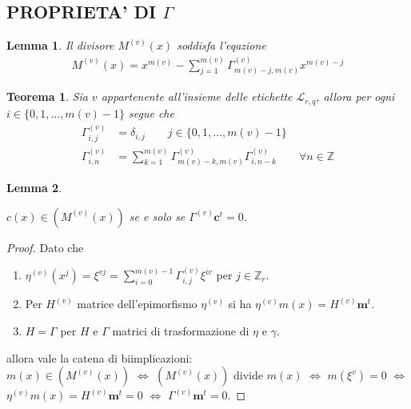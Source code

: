 \documentclass[mathserif]{beamer}
\newtheorem{lemmax}{Lemma}[section]
\newtheorem{teorema}{Teorema}
\begin{document}
\subsection{PROPRIETA' DI $\Gamma$}
\begin{frame}
    \begin{lemmax}
      Il divisore $M^{(v)}(x)$ soddisfa l'eqazione
      \begin{align*}
	  M^{(v)}(x) = x^{m(v)} - \sum_{j=1}^{m(v)} \Gamma_{m(v) - j, m(v)}^{(v)}  x^{m(v) - j}
      \end{align*}
    \end{lemmax}
    \begin{teorema} \label{teo:winogradRicorrenza}
	Sia $v$ appartenente all'insieme delle etichette $\mathscr{L}_{r,q}$, allora per ogni $i \in \lbrace  0,1, \dots, m(v) - 1 \rbrace$ segue che
	\begin{align*} \label{eq:winogradRicorrenza}
	    \Gamma_{i,j}^{(v)} &= \delta_{i,j}  \qquad j \in \lbrace  0,1, \dots, m(v) - 1 \rbrace \\
	    \Gamma_{i,n}^{(v)} &= \sum_{k=1}^{m(v)} \Gamma_{m(v) - k, m(v)}^{(v)} \Gamma_{i,n-k}^{(v)} \qquad \forall n \in \mathbb{Z}
	  \end{align*}
      \end{teorema}
\end{frame}

\begin{frame}
    \begin{lemmax}
    \begin{center}
      $c(x) \in (M^{(v)}(x))$ se e solo se  $\Gamma^{(v)} \mathbf{c}^{t} = 0$.
    \end{center}
    \end{lemmax}
    \begin{proof}
      Dato che
      \begin{enumerate}
	  \item $\eta^{(v)}(x^{j}) = \xi^{vj} = \sum_{i=0}^{m(v)-1}\Gamma_{i,j}^{(v)}\xi^{iv}$ per $j \in \mathbb{Z}_{r}$.
	  \item Per $H^{(v)}$ matrice dell'epimorfismo $\eta^{(v)}$ si ha $\eta^{(v)}m(x) = H^{(v)}\mathbf{m}^{t}$.
	  \item $H=\Gamma$ per $H$ e $\Gamma$ matrici di trasformazione di $\eta$ e $\gamma$.
      \end{enumerate}
      allora vale la catena di biimplicazioni:\\
      $m(x)\in (M^{(v)}(x))$ $\iff$ $(M^{(v)}(x))$ divide $m(x)$ $\iff$ $m(\xi^{v}) = 0$ $\iff$ $\eta^{(v)}m(x) = H^{(v)}\mathbf{m}^{t} = 0$ $\iff$ $ \Gamma^{(v)}\mathbf{m}^{t} = 0$.
    \end{proof}

\end{frame}
\end{document}
